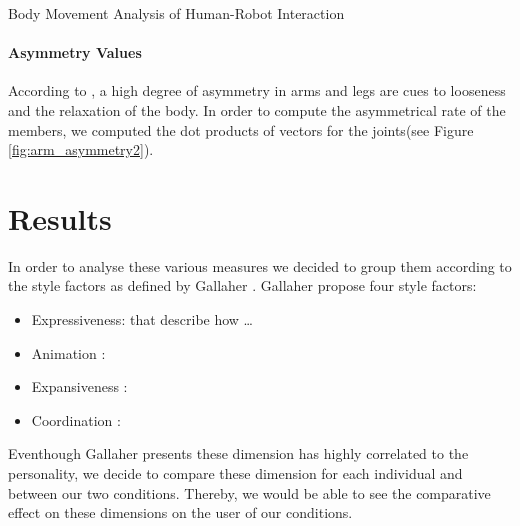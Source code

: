 \documentclass[a4paper,twocolumn]{svjour3}
\begin{document}
Body Movement Analysis of Human-Robot Interaction



\paragraph{Asymmetry Values}
According to \cite{Mehrabian}, a high degree of asymmetry in arms and legs are cues to looseness and the relaxation of the body.
In order to compute the asymmetrical rate of the members, we computed the dot products of vectors for the joints(see Figure \ref{fig:arm_asymmetry2}). 










\section{Results}
In order to analyse these various measures we decided to group them according to the style factors as defined by Gallaher \cite{Gallaher1992}. 
Gallaher propose four style factors: 
\begin{itemize}
\item Expressiveness: that describe how \dots
\item Animation :
\item Expansiveness : 
\item Coordination : 
\end{itemize}
Eventhough Gallaher presents these dimension has highly correlated to the personality, we decide to compare these dimension for each individual and between our two conditions. 
Thereby, we would be able to see the comparative effect on these dimensions on the user of our conditions. 
\end{document}
